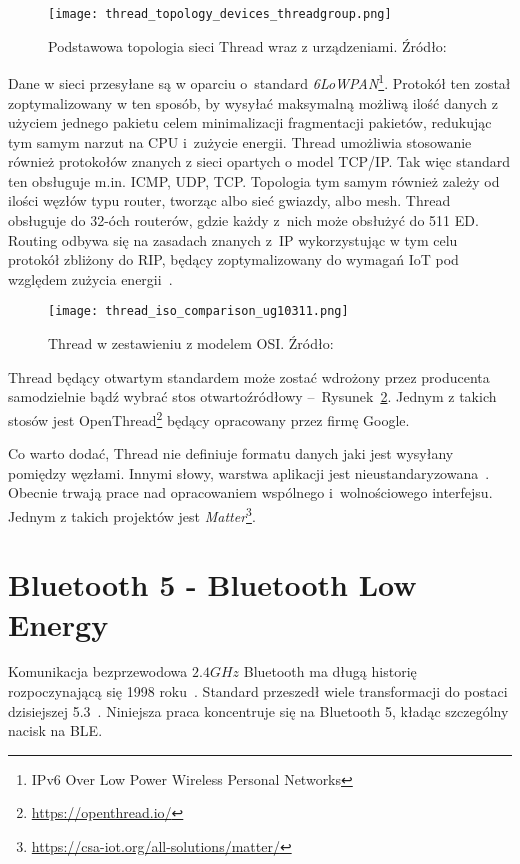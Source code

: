 \begin{figure}[!ht]
	\centering \texttt{[image: thread\_topology\_devices\_threadgroup.png]}
	\caption{Podstawowa topologia sieci Thread wraz z urządzeniami. Źródło:~\cite{thread_group_thread_2020}}
	\label{rys:thread_topology_devices_threadgroup}
\end{figure}

Dane w sieci przesyłane są w oparciu o~standard \textit{6LoWPAN}\footnote{IPv6 Over Low Power Wireless Personal Networks}.
Protokół ten został zoptymalizowany w ten sposób, by wysyłać maksymalną możliwą ilość danych z użyciem jednego
pakietu celem minimalizacji fragmentacji pakietów, redukując tym samym narzut na CPU i~zużycie energii.
Thread umożliwia stosowanie również protokołów znanych z sieci opartych o model TCP/IP. Tak więc
standard ten obsługuje m.in. \gls{ICMP}, \gls{UDP}, \gls{TCP}. Topologia tym samym również zależy od ilości
węzłów typu router, tworząc albo sieć gwiazdy, albo mesh. Thread obsługuje do 32-óch routerów, gdzie każdy
z~nich może obsłużyć do 511 \gls{ED}. Routing odbywa się na zasadach znanych z~\gls{IP}
wykorzystując w tym celu protokół zbliżony do \gls{RIP}, będący zoptymalizowany do wymagań
IoT pod względem zużycia energii~\cite{silicon_laboratories_ug10311_2022}.

\begin{figure}[!ht]
	\centering \texttt{[image: thread\_iso\_comparison\_ug10311.png]}
	\caption{Thread w zestawieniu z modelem OSI. Źródło:~\cite{silicon_laboratories_ug10311_2022}}
	\label{rys:thread_iso_comparison_ug10311}
\end{figure}

Thread będący otwartym standardem może zostać wdrożony przez producenta samodzielnie bądź wybrać stos otwartoźródłowy --~Rysunek~\ref{rys:thread_iso_comparison_ug10311}.
Jednym z takich stosów jest OpenThread\footnote{\url{https://openthread.io/}} będący opracowany przez firmę Google.

Co warto dodać, Thread nie definiuje formatu danych jaki jest wysyłany pomiędzy węzłami. Innymi słowy,
warstwa aplikacji jest nieustandaryzowana~\cite{silicon_laboratories_ug10311_2022}. Obecnie trwają
prace nad opracowaniem wspólnego i~wolnościowego interfejsu. Jednym z takich projektów jest \textit{Matter}\footnote{\url{https://csa-iot.org/all-solutions/matter/}}.

\section{Bluetooth 5 - Bluetooth Low Energy}
Komunikacja bezprzewodowa $2.4GHz$ Bluetooth ma długą historię rozpoczynającą się 1998 roku~\cite{noauthor_bluetooth_nodate-1}.
Standard przeszedł wiele transformacji do postaci dzisiejszej 5.3~\cite{woolley_bluetooth_2021}. Niniejsza praca
koncentruje się na Bluetooth 5, kładąc szczególny nacisk na \gls{BLE}.

